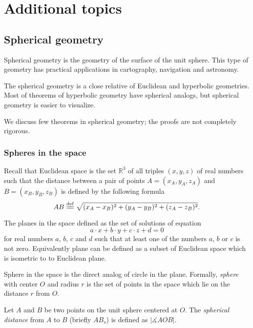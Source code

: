 \part*{Additional topics}

\chapter{Spherical geometry}
\label{chap:sphere}

Spherical geometry is the geometry 
of the surface of the unit sphere.
This type of geometry has practical  applications in cartography, navigation  and astronomy.

The spherical geometry is a close relative of Euclidean and hyperbolic geometries.
Most of theorems of hyperbolic geometry have spherical analogs,
but spherical geometry is easier to visualize. 

We discuss few theorems in spherical geometry;
the proofs are not completely rigorous.

\section*{Spheres in the space}

Recall that Euclidean space is the set $\mathbb{R}^3$ of all triples $(x,y,z)$ of real numbers
such that the distance between a pair of points
$A=(x_A,y_A,z_A)$ and $B=(x_B,y_B,z_B)$
is defined by the following formula
$$AB
\df
\sqrt{(x_A-x_B)^2+(y_A-y_B)^2+(z_A-z_B)^2}.$$

The planes in the space defined as the set of solutions of equation 
$$a\cdot x+b\cdot y+c\cdot z+d=0$$ 
for real numbers $a$, $b$, $c$ and $d$ such that at least one of the numbers $a$, $b$ or $c$ is not zero.
Equivalently plane can be defined as a subset of Euclidean space which is isometric to to Euclidean plane.

Sphere in the space is the direct analog of circle in the plane.
Formally, \emph{sphere} with center $O$ and radius $r$ is the set of points in the space which lie on the distance $r$ from $O$.

Let $A$ and $B$ be two points on the unit sphere centered at $O$.
The \emph{spherical distance} from $A$ to $B$
(briefly $AB_s$)
 is defined as  $|\measuredangle AOB|$. 

